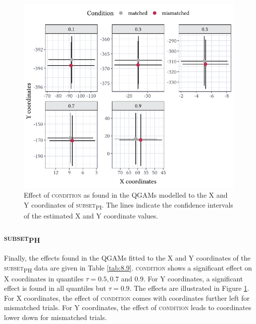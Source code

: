 \begin{figure}
    \centering
    \includegraphics[]{figures/fig8.5.pdf}
    \caption{Effect of \textsc{condition} as found in the QGAMs modelled to the X and Y coordinates of \textsc{subset\textsubscript{PI}}. The lines indicate the confidence intervals of the estimated X and Y coordinate values.}
    \label{fig:8_5}
\end{figure}

\subsubsection{\textsc{subset\textsubscript{PH}}}\label{section08_2_2_4}

Finally, the effects found in the QGAMs fitted to the X and Y coordinates of the \textsc{subset\textsubscript{PH}} data are given in Table \ref{tab:8.9}. \textsc{condition} shows a significant effect on X coordinates in quantiles $\tau=0.5,0.7$ and $0.9$. For Y coordinates, a significant effect is found in all quantiles but $\tau=0.9$. The effects are illustrated in Figure \ref{fig:8_5}. For X coordinates, the effect of \textsc{condition} comes with coordinates further left for mismatched trials. For Y coordinates, the effect of \textsc{condition} leads to coordinates lower down for mismatched trials.

